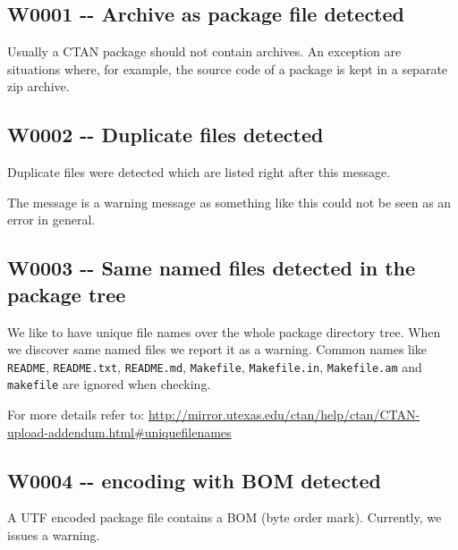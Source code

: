 \hypertarget{w0001----archive-as-package-file-detected}{%
\subsection{W0001 -\/- Archive as package file
detected}\label{w0001----archive-as-package-file-detected}}

Usually a CTAN package should not contain archives. An exception are
situations where, for example, the source code of a package is kept in a
separate zip archive.

\hypertarget{w0002----duplicate-files-detected}{%
\subsection{W0002 -\/- Duplicate files
detected}\label{w0002----duplicate-files-detected}}

Duplicate files were detected which are listed right after this message.

The message is a warning message as something like this could not be
seen as an error in general.

\hypertarget{w0003----same-named-files-detected-in-the-package-tree}{%
\subsection{W0003 -\/- Same named files detected in the package
tree}\label{w0003----same-named-files-detected-in-the-package-tree}}

We like to have unique file names over the whole package directory tree.
When we discover same named files we report it as a warning. Common
names like \texttt{README}, \texttt{README.txt}, \texttt{README.md},
\texttt{Makefile}, \texttt{Makefile.in}, \texttt{Makefile.am} and
\texttt{makefile} are ignored when checking.

For more details refer to:
\href{http://mirror.utexas.edu/ctan/help/ctan/CTAN-upload-addendum.html\#uniquefilenames}{http://mirror.utexas.edu/ctan/help/ctan/CTAN-upload-addendum.html\#uniquefilenames}

\hypertarget{w0004-----encoding-with-bom-detected}{%
\subsection{\texorpdfstring{W0004 -\/- encoding with BOM
detected}{W0004 -\/-  encoding with BOM detected}}\label{w0004-----encoding-with-bom-detected}}

A UTF encoded package file contains a BOM (byte order mark). Currently,
we issues a warning.

